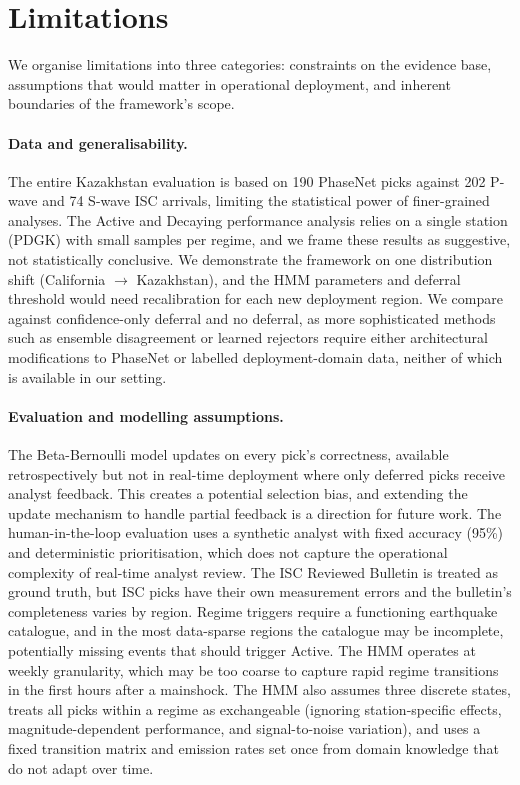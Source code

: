 \section{Limitations}
\label{sec:discussion}

We organise limitations into three categories: constraints on the evidence base, assumptions that would matter in operational deployment, and inherent boundaries of the framework's scope.

\paragraph{Data and generalisability.} The entire Kazakhstan evaluation is based on 190 PhaseNet picks against 202 P-wave and 74 S-wave ISC arrivals, limiting the statistical power of finer-grained analyses. The Active and Decaying performance analysis relies on a single station (PDGK) with small samples per regime, and we frame these results as suggestive, not statistically conclusive. We demonstrate the framework on one distribution shift (California $\to$ Kazakhstan), and the HMM parameters and deferral threshold would need recalibration for each new deployment region. We compare against confidence-only deferral and no deferral, as more sophisticated methods such as ensemble disagreement or learned rejectors require either architectural modifications to PhaseNet or labelled deployment-domain data, neither of which is available in our setting.

\paragraph{Evaluation and modelling assumptions.} The Beta-Bernoulli model updates on every pick's correctness, available retrospectively but not in real-time deployment where only deferred picks receive analyst feedback. This creates a potential selection bias, and extending the update mechanism to handle partial feedback is a direction for future work. The human-in-the-loop evaluation uses a synthetic analyst with fixed accuracy (95\%) and deterministic prioritisation, which does not capture the operational complexity of real-time analyst review. The ISC Reviewed Bulletin is treated as ground truth, but ISC picks have their own measurement errors and the bulletin's completeness varies by region. Regime triggers require a functioning earthquake catalogue, and in the most data-sparse regions the catalogue may be incomplete, potentially missing events that should trigger Active. The HMM operates at weekly granularity, which may be too coarse to capture rapid regime transitions in the first hours after a mainshock. The HMM also assumes three discrete states, treats all picks within a regime as exchangeable (ignoring station-specific effects, magnitude-dependent performance, and signal-to-noise variation), and uses a fixed transition matrix and emission rates set once from domain knowledge that do not adapt over time.

